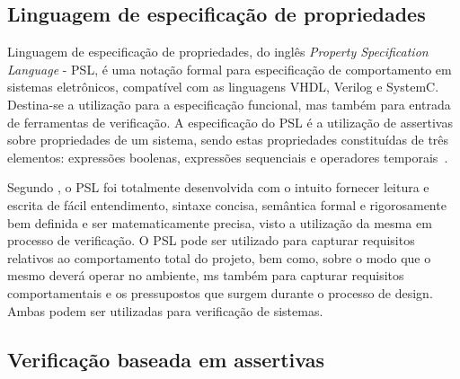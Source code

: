 \subsection{Linguagem de especificação de propriedades}
Linguagem de especificação de propriedades, do inglês \textit{Property Specification Language} - PSL, é uma notação formal para especificação de comportamento em sistemas eletrônicos, compatível com as linguagens VHDL\cite{IEEEVHDLLanguage}, Verilog\cite{IEEEVerilogLanguage} e SystemC\cite{IEEESystemCLanguage}. Destina-se a utilização para a especificação funcional, mas também para entrada de ferramentas de verificação. A especificação do PSL é a utilização de assertivas sobre propriedades de um sistema, sendo estas propriedades constituídas de três elementos: expressões boolenas, expressões sequenciais e operadores temporais~\cite{IEEEPSL}.

\par
Segundo \cite{IEEEPSL}, o PSL foi totalmente desenvolvida com o intuito fornecer leitura e escrita de fácil entendimento, sintaxe concisa, semântica formal e rigorosamente bem definida e ser matematicamente precisa, visto a utilização da mesma em processo de verificação. 
% 
O PSL pode ser utilizado para capturar requisitos relativos ao comportamento total do projeto, bem como, sobre o modo que o mesmo deverá operar no ambiente, ms também para capturar requisitos comportamentais e os pressupostos que surgem durante o processo de design. Ambas podem ser utilizadas para verificação de sistemas. 





\subsection{Verificação baseada em assertivas}

